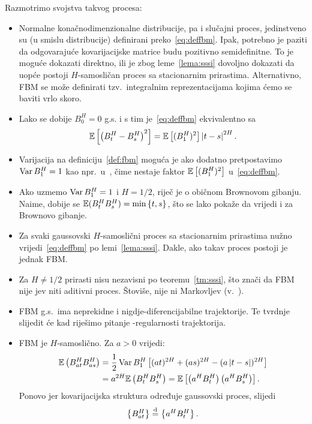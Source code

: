 \documentclass[main.tex]{subfiles}
\begin{document}
\noindent Razmotrimo svojstva takvog procesa:
\begin{itemize}
	\item Normalne konačnodimenzionalne distribucije, pa i slučajni proces, jedinstveno su (u smislu distribucije) definirani preko~\eqref{eq:deffbm}. Ipak, potrebno je paziti da odgovarajuće kovarijacijske matrice budu pozitivno semidefinitne. To je moguće dokazati direktno,
	      ili je zbog leme~\ref{lema:sssi} dovoljno dokazati da uopće postoji \( H \)-samosličan
	      proces sa stacionarnim prirastima. Alternativno, FBM se može definirati tzv.\ integralnim
	      reprezentacijama kojima ćemo se baviti vrlo skoro.

	\item Lako se dobije \( B^H_0 = 0 \) g.s. i s tim je~\eqref{eq:deffbm} ekvivalentno sa
	      \begin{equation}\label{eq:deffbmalt}
		      \mathbb{E} \left[ \left( B^H_t-B^H_s \right)^2 \right] = \mathbb{E}\left[ (B^H_1)^2 \right] \left| {t-s} \right|^{2H}.
	      \end{equation}


	\item Varijacija na definiciju~\ref{def:fbm} moguća je ako dodatno pretpostavimo \( \operatorname{Var} B_1^H = 1 \) kao npr.\ u~\cite{se}, čime nestaje faktor \( \mathbb{E}\left[ (B_1^H)^2 \right] \) u~\eqref{eq:deffbm}.

	\item Ako uzmemo \( \operatorname{Var} B_1^H = 1 \) i \( H=1/2 \), riječ je o običnom Brownovom gibanju. Naime, dobije se \( \mathbb{E}(B^H_tB^H_s) = \min\left\{ t,s \right\} \), što se lako pokaže da vrijedi i za Brownovo gibanje.

	\item Za svaki gaussovski \( H \)-samoslični proces sa stacionarnim prirastima
	      nužno vrijedi~\eqref{eq:deffbm} po lemi~\eqref{lema:sssi}. Dakle,
	      ako takav proces postoji je jednak FBM.


	\item Za \( H \neq 1/2 \) prirasti nisu nezavisni po teoremu~\ref{tm:sssi}, što znači da FBM nije \levy jev niti aditivni proces. Štoviše, nije ni Markovljev (v.~\cite{se}).

	\item FBM g.s.\ ima neprekidne i nigdje-diferencijabilne trajektorije. Te tvrdnje
	      slijedit će kad riješimo pitanje \holder -regularnosti trajektorija.

	\item FBM je \( H \)-samoslično. Za \( a > 0 \) vrijedi:
	      \begin{align}
		      \mathbb{E} \left( B^H_{at} B^H_{as} \right) & = \frac 12 \operatorname{Var} B^H_1 \left[ (at)^{2H} + (as)^{2H} - (a\left| {t-s} \right|)^{2H} \right] \\
		                                          & = a^{2H}\mathbb{E} \left( B^H_t B^H_s \right)
		      = \mathbb{E} \left[ \left( a^H B^H_t \right)\left( a^HB^H_s \right) \right].
	      \end{align}
	      Ponovo jer kovarijacijska struktura određuje gaussovski proces,
	      slijedi \[ \left\{ B^H_{at} \right\} \stackrel{\mathrm d}{=} \left\{ a^HB^H_t \right\}. \]


\end{itemize}
\end{document}
